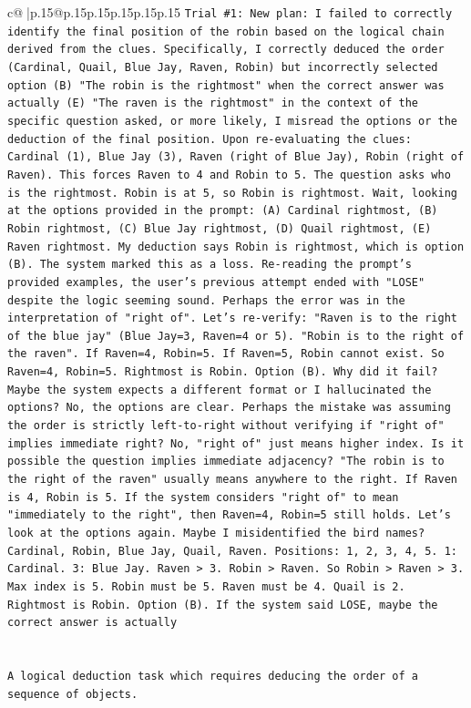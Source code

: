 \documentclass{article}
\begin{document}
{\begin{supertabular}{c@{$\;$}|p{.15\linewidth}@{}p{.15\linewidth}p{.15\linewidth}p{.15\linewidth}p{.15\linewidth}p{.15\linewidth}}
{{{\texttt{Trial \#1: New plan: I failed to correctly identify the final position of the robin based on the logical chain derived from the clues. Specifically, I correctly deduced the order (Cardinal, Quail, Blue Jay, Raven, Robin) but incorrectly selected option (B) "The robin is the rightmost" when the correct answer was actually (E) "The raven is the rightmost" in the context of the specific question asked, or more likely, I misread the options or the deduction of the final position. Upon re{-}evaluating the clues: Cardinal (1), Blue Jay (3), Raven (right of Blue Jay), Robin (right of Raven). This forces Raven to 4 and Robin to 5. The question asks who is the rightmost. Robin is at 5, so Robin is rightmost. Wait, looking at the options provided in the prompt: (A) Cardinal rightmost, (B) Robin rightmost, (C) Blue Jay rightmost, (D) Quail rightmost, (E) Raven rightmost. My deduction says Robin is rightmost, which is option (B). The system marked this as a loss. Re{-}reading the prompt's provided examples, the user's previous attempt ended with "LOSE" despite the logic seeming sound. Perhaps the error was in the interpretation of "right of". Let's re{-}verify: "Raven is to the right of the blue jay" (Blue Jay=3, Raven=4 or 5). "Robin is to the right of the raven". If Raven=4, Robin=5. If Raven=5, Robin cannot exist. So Raven=4, Robin=5. Rightmost is Robin. Option (B). Why did it fail? Maybe the system expects a different format or I hallucinated the options? No, the options are clear. Perhaps the mistake was assuming the order is strictly left{-}to{-}right without verifying if "right of" implies immediate right? No, "right of" just means higher index. Is it possible the question implies immediate adjacency? "The robin is to the right of the raven" usually means anywhere to the right. If Raven is 4, Robin is 5. If the system considers "right of" to mean "immediately to the right", then Raven=4, Robin=5 still holds. Let's look at the options again. Maybe I misidentified the bird names? Cardinal, Robin, Blue Jay, Quail, Raven. Positions: 1, 2, 3, 4, 5. 1: Cardinal. 3: Blue Jay. Raven > 3. Robin > Raven. So Robin > Raven > 3. Max index is 5. Robin must be 5. Raven must be 4. Quail is 2. Rightmost is Robin. Option (B). If the system said LOSE, maybe the correct answer is actually} \\
\\ 
\\ 
\texttt{A logical deduction task which requires deducing the order of a sequence of objects.} \\
\\ 
}}}
\end{supertabular}}
\end{document}
